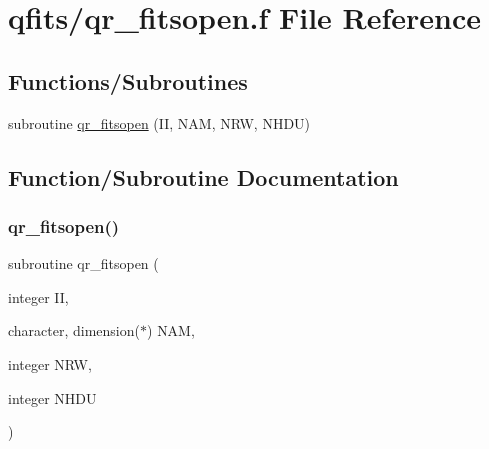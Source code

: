 \hypertarget{qr__fitsopen_8f}{}\section{qfits/qr\+\_\+fitsopen.f File Reference}
\label{qr__fitsopen_8f}
\subsection*{Functions/\+Subroutines}
\begin{DoxyCompactItemize}
\item 
subroutine \hyperlink{qr__fitsopen_8f_a51b93c7d24290c7c487c0d9d57b6b48f}{qr\+\_\+fitsopen} (II, N\+AM, N\+RW, N\+H\+DU)
\end{DoxyCompactItemize}


\subsection{Function/\+Subroutine Documentation}
\mbox{\label{qr__fitsopen_8f_a51b93c7d24290c7c487c0d9d57b6b48f}} 
\subsubsection{\texorpdfstring{qr\+\_\+fitsopen()}{qr\_fitsopen()}}
{\footnotesize\ttfamily subroutine qr\+\_\+fitsopen (\begin{DoxyParamCaption}\item[{integer}]{II,  }\item[{character, dimension($\ast$)}]{N\+AM,  }\item[{integer}]{N\+RW,  }\item[{integer}]{N\+H\+DU }\end{DoxyParamCaption})}

